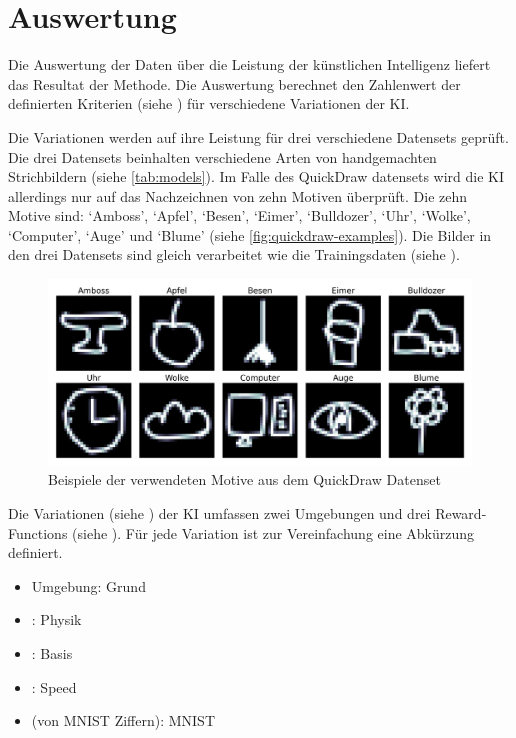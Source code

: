 \section{Auswertung}\label{chap:m_auswert}
Die Auswertung der Daten über die Leistung der künstlichen Intelligenz liefert
das Resultat der Methode. Die Auswertung berechnet den Zahlenwert der
definierten Kriterien (siehe ) für verschiedene Variationen
der KI.

Die Variationen werden auf ihre Leistung für drei verschiedene Datensets
geprüft. Die drei Datensets beinhalten verschiedene Arten von handgemachten
Strichbildern (siehe \autoref{tab:models}). Im Falle des QuickDraw datensets
wird die KI allerdings nur auf das Nachzeichnen von zehn Motiven überprüft. Die
zehn Motive sind: `Amboss', `Apfel', `Besen', `Eimer', `Bulldozer', `Uhr',
`Wolke', `Computer', `Auge' und `Blume' (siehe
\autoref{fig:quickdraw-examples}). Die Bilder in den drei Datensets sind gleich
verarbeitet wie die Trainingsdaten (siehe ). 

\begin{figure}[!ht]
  \centering
  \includegraphics[width=\textwidth]{images/methode/quickdraw-examples.png}
  \caption{Beispiele der verwendeten Motive aus dem QuickDraw Datenset}\label{fig:quickdraw-examples}
\end{figure}


Die Variationen (siehe ) der KI umfassen zwei Umgebungen und
drei Reward-Functions (siehe ). Für jede Variation ist zur
Vereinfachung eine Abkürzung definiert.
\begin{itemize}
  \item {} Umgebung: Grund
  \item {}: Physik
  \item {}: Basis
  \item {}: Speed
  \item {} (von MNIST Ziffern): MNIST
\end{itemize}

